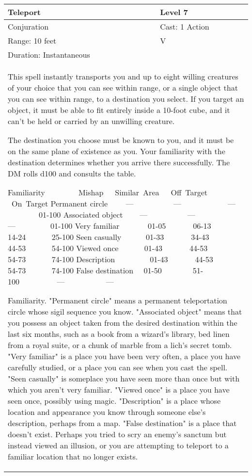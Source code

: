 \documentclass[11pt]{report}
\begin{document}
\begin{table}[H]
	\begin{tabular}{||p{6cm}|p{6cm}||}
		\hline\hline
		\bf{Teleport} & Level 7\\ \hline
		Conjuration & Cast: 1 Action\\ \hline
		Range: 10 feet & V\\ \hline
		Duration: Instantaneous & \\ \hline
		\multicolumn{2}{||p{12cm}||}{This spell instantly transports you and up to eight willing creatures of your choice that you can see within range, or a single object that you can see within range, to a destination you select. If you target an object, it must be able to fit entirely inside a 10-foot cube, and it can’t be held or carried by an unwilling creature.

The destination you choose must be known to you, and it must be on the same plane of existence as you. Your familiarity with the destination determines whether you arrive there successfully. The DM rolls d100 and consults the table.

Familiarity     Mishap  Similar Area  Off Target  On Target
Permanent circle   —       —         —     01-100
Associated object    —       —       —       01-100
Very familiar     01-05      06-13     14-24    25-100
Seen casually     01-33      34-43     44-53    54-100
Viewed once    01-43      44-53     54-73    74-100
Description       01-43      44-53     54-73    74-100
False destination  01-50       51-100      —      —

Familiarity.
"Permanent circle" means a permanent teleportation circle whose sigil sequence you know. "Associated object" means that you possess an object taken from the desired destination within the last six months, such as a book from a wizard's library, bed linen from a royal suite, or a chunk of marble from a lich's secret tomb.
"Very familiar" is a place you have been very often, a place you have carefully studied, or a place you can see when you cast the spell. "Seen casually" is someplace you have seen more than once but with which you aren't very familiar. "Viewed once" is a place you have seen once, possibly using magic. "Description" is a place whose location and appearance you know through someone else's description, perhaps from a map.
"False destination" is a place that doesn't exist. Perhaps you tried to scry an enemy's sanctum but instead viewed an illusion, or you are attempting to teleport to a familiar location that no longer exists.

}
\end{tabular}
\end{table}
\end{document}
